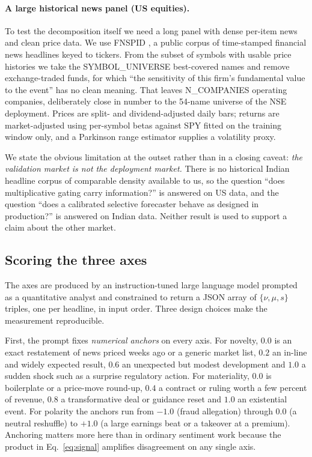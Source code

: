 \paragraph{A large historical news panel (US equities).} To test the
decomposition itself we need a long panel with dense per-item news and clean
price data. We use FNSPID \citep{dong2024}, a public corpus of time-stamped
financial news headlines keyed to tickers. From the subset of symbols with
usable price histories we take the SYMBOL\_UNIVERSE best-covered names and remove
exchange-traded funds, for which ``the sensitivity of this firm's fundamental
value to the event'' has no clean meaning. That leaves N\_COMPANIES operating
companies, deliberately close in number to the 54-name universe of the NSE
deployment. Prices are split- and dividend-adjusted daily bars; returns are
market-adjusted using per-symbol betas against SPY fitted on the training window
only, and a Parkinson range estimator \citep{parkinson1980} supplies a volatility
proxy.

We state the obvious limitation at the outset rather than in a closing caveat:
\emph{the validation market is not the deployment market.} There is no historical
Indian headline corpus of comparable density available to us, so the question
``does multiplicative gating carry information?'' is answered on US data, and the
question ``does a calibrated selective forecaster behave as designed in
production?'' is answered on Indian data. Neither result is used to support a
claim about the other market.

\subsection{Scoring the three axes}\label{sec:scoring}

The axes are produced by an instruction-tuned large language model prompted as a
quantitative analyst and constrained to return a JSON array of
$\{\nu,\mu,s\}$ triples, one per headline, in input order. Three design choices
make the measurement reproducible.

First, the prompt fixes \emph{numerical anchors} on every axis. For novelty,
$0.0$ is an exact restatement of news priced weeks ago or a generic market list,
$0.2$ an in-line and widely expected result, $0.6$ an unexpected but modest
development and $1.0$ a sudden shock such as a surprise regulatory action. For
materiality, $0.0$ is boilerplate or a price-move round-up, $0.4$ a contract or
ruling worth a few percent of revenue, $0.8$ a transformative deal or guidance
reset and $1.0$ an existential event. For polarity the anchors run from $-1.0$
(fraud allegation) through $0.0$ (a neutral reshuffle) to $+1.0$ (a large
earnings beat or a takeover at a premium). Anchoring matters more here than in
ordinary sentiment work because the product in Eq.~\eqref{eq:signal} amplifies
disagreement on any single axis.

